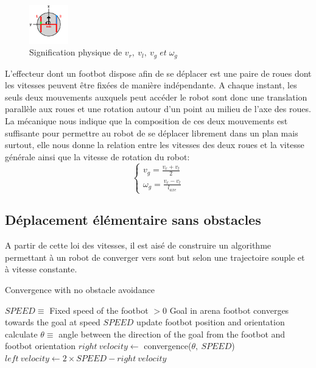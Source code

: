 \begin{figure}
  \vspace{-3em}
  \begin{center}
    \includegraphics[width=0.15\textwidth]{pics/robotWheels.png}
  \end{center}
  \vspace{-2em}
  \caption{Signification physique de \(v_r,\: v_l,\: v_g \; et \; \omega_g \) \cite{argosSite1}}
  \vspace{-2em}
  \end{figure}
L'effecteur dont un footbot dispose afin de se déplacer est une paire de roues dont les vitesses peuvent être fixées de manière indépendante. A chaque instant, les seuls deux mouvements auxquels peut accéder le robot sont donc une translation parallèle aux roues et une rotation autour d'un point au milieu de l'axe des roues. La mécanique \cite{meca} nous indique que la composition de ces deux mouvements est suffisante pour permettre au robot de se déplacer librement dans un plan mais surtout, elle nous donne la relation entre les vitesses des deux roues et la vitesse générale ainsi que la vitesse de rotation du robot:
\begin{equation}
\begin{cases}
v_g=\frac{v_r+v_l}{2}\\
\omega_g=\frac{v_r-v_l}{l_{axe}}
\end{cases}  
\end{equation}

\subsection{Déplacement élémentaire sans obstacles}

A partir de cette loi des vitesses, il est aisé de construire un algorithme permettant à un robot de converger vers sont but selon une trajectoire souple et à vitesse constante.

\begin{algorithm}                    
\caption{Convergence with no obstacle avoidance}
\label{simpleConvergence}
\begin{algorithmic}
  \REQUIRE \(SPEED \equiv \) Fixed speed of the footbot \(> 0\)
  \REQUIRE Goal in arena
  \ENSURE footbot converges towards the goal at speed \(SPEED\)
    \STATE update footbot position and orientation
    \STATE calculate \( \theta \equiv\) angle between the direction of the goal from the footbot and footbot orientation
    \STATE \( right\:velocity \gets\) convergence(\(\theta,\:SPEED\))
    \STATE \( left\:velocity \gets 2 \times SPEED-right\:velocity\) 
  \ENDWHILE
\end{algorithmic}
\end{algorithm}

